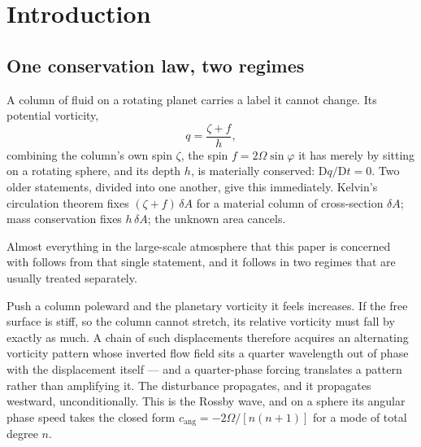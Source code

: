 %
%
%

\section{Introduction}
\label{sec:intro}

\subsection{One conservation law, two regimes}

A column of fluid on a rotating planet carries a label it cannot change. Its
potential vorticity,
%
\begin{equation}
q = \frac{\zeta + f}{h},
\label{eq:intro-pv}
\end{equation}
%
combining the column's own spin $\zeta$, the spin $f = 2\Omega\sin\varphi$ it has
merely by sitting on a rotating sphere, and its depth $h$, is materially
conserved: $\mathrm{D}q/\mathrm{D}t = 0$. Two older statements, divided into one
another, give this immediately. Kelvin's circulation theorem fixes
$(\zeta+f)\,\delta A$ for a material column of cross-section $\delta A$; mass
conservation fixes $h\,\delta A$; the unknown area cancels.

Almost everything in the large-scale atmosphere that this paper is concerned with
follows from that single statement, and it follows in two regimes that are usually
treated separately.

Push a column poleward and the planetary vorticity it feels increases. If the free
surface is stiff, so the column cannot stretch, its relative vorticity must fall
by exactly as much. A chain of such displacements therefore acquires an
alternating vorticity pattern whose inverted flow field sits a quarter wavelength
out of phase with the displacement itself --- and a quarter-phase forcing
translates a pattern rather than amplifying it. The disturbance propagates, and it
propagates westward, unconditionally. This is the Rossby wave, and on a sphere its
angular phase speed takes the closed form $c_{\mathrm{ang}} = -2\Omega/[n(n+1)]$
for a mode of total degree $n$.

